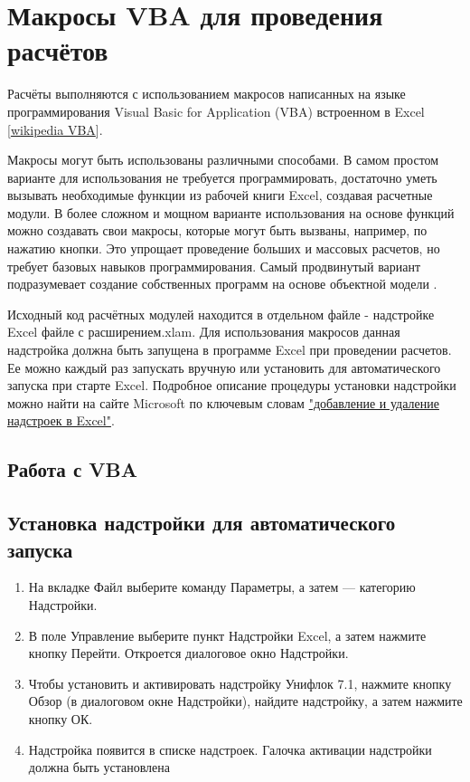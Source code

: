 \chapter{Макросы VBA для проведения расчётов}

Расчёты \unf{} выполняются с использованием макросов написанных на языке программирования Visual Basic for Application (VBA) встроенном в Excel [\href{https://ru.wikipedia.org/wiki/Visual_Basic_for_Applications}{wikipedia VBA}]. 

Макросы \unf{} могут быть использованы различными способами. В самом простом варианте для использования \unf{} не требуется программировать, достаточно уметь вызывать необходимые функции из рабочей книги Excel, создавая расчетные модули. В более сложном и мощном варианте использования на основе функций \unf{} можно создавать свои макросы, которые могут быть вызваны, например, по нажатию кнопки. Это упрощает проведение больших и массовых расчетов, но требует базовых навыков программирования. Самый продвинутый вариант подразумевает создание собственных программ на основе объектной модели \unf{}. 


Исходный код расчётных модулей находится в отдельном файле - надстройке Excel файле с расширением.xlam. Для использования макросов данная надстройка должна быть запущена в программе Excel при проведении расчетов. Ее можно каждый раз запускать вручную или установить для автоматического запуска при старте Excel. Подробное описание процедуры установки надстройки можно найти на сайте Microsoft по ключевым словам  \href{https://support.office.com/ru-ru/article/%D0%94%D0%BE%D0%B1%D0%B0%D0%B2%D0%BB%D0%B5%D0%BD%D0%B8%D0%B5-%D0%B8-%D1%83%D0%B4%D0%B0%D0%BB%D0%B5%D0%BD%D0%B8%D0%B5-%D0%BD%D0%B0%D0%B4%D1%81%D1%82%D1%80%D0%BE%D0%B5%D0%BA-%D0%B2-excel-0af570c4-5cf3-4fa9-9b88-403625a0b460}{"добавление и удаление надстроек в Excel"}.


\section{Работа с VBA}

\section{Установка надстройки для автоматического запуска}
\begin{enumerate}
	\item На вкладке Файл выберите команду Параметры, а затем — категорию Надстройки.
	\item В поле Управление выберите пункт Надстройки Excel, а затем нажмите кнопку Перейти. Откроется диалоговое окно Надстройки.
	\item Чтобы установить и активировать надстройку Унифлок 7.1, нажмите кнопку Обзор (в диалоговом окне Надстройки), найдите надстройку, а затем нажмите кнопку ОК.
	\item Надстройка появится в списке надстроек. Галочка активации надстройки должна быть установлена
\end{enumerate}	

